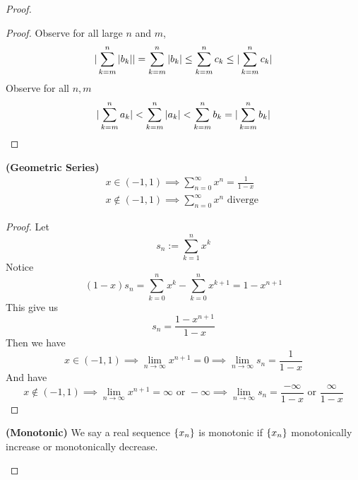 \documentclass{report}
\begin{document}
\begin{proof}
\begin{theorem}
\end{theorem}
\begin{proof}
Observe for all large $n$ and $m$,
\begin{equation}
|\sum_{k=m}^n |b_k||=\sum_{k=m}^n |b_k|\leq \sum_{k=m}^n c_k\leq |\sum_{k=m}^n c_k|
\end{equation}
Observe for all $n,m$
\begin{equation}
|\sum_{k=m}^n a_k|<\sum_{k=m}^n |a_k|<\sum_{k=m}^n b_k=|\sum_{k=m}^n b_k|
\end{equation}
\end{proof}
\begin{theorem}
\label{4.2.8}
\textbf{(Geometric Series)} 
\begin{align}
x\in (-1,1)\implies \sum_{n=0}^\infty x^n=\frac{1}{1-x}\\
x\not\in (-1,1)\implies \sum_{n=0}^\infty x^n\text{ diverge }
\end{align}
\end{theorem}
\begin{proof}
Let 
\begin{equation}
s_n:=\sum_{k=1}^n x^k
\end{equation}
Notice
\begin{equation}
  (1-x)s_n=\sum_{k=0}^n x^k-\sum_{k=0}^n x^{k+1}=1-x^{n+1}
\end{equation}
This give us
\begin{equation}
s_n=\frac{1-x^{n+1}}{1-x}
\end{equation}
Then we have
\begin{equation}
x\in (-1,1)\implies \lim_{n\to\infty}x^{n+1}=0\implies \lim_{n\to\infty}s_n=\frac{1}{1-x}
\end{equation}
And have
\begin{equation}
x\not\in (-1,1)\implies \lim_{n\to\infty}x^{n+1}=\infty\text{ or }-\infty\implies \lim_{n\to\infty}s_n= \frac{-\infty}{1-x}\text{ or }\frac{\infty}{1-x}
\end{equation}
\end{proof}
\begin{definition}
\label{4.2.9}
\textbf{(Monotonic)} We say a real sequence $\{ x_n \}$ is monotonic if $\{ x_n \}$ monotonically increase or monotonically decrease.

\end{definition}
\end{proof}
\end{document}
